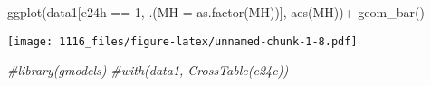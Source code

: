 \documentclass[
]{article}
\newenvironment{Shaded}{\begin{snugshade}}{\end{snugshade}}
\newcommand{\AttributeTok}[1]{\textcolor[rgb]{0.77,0.63,0.00}{#1}}
\newcommand{\CommentTok}[1]{\textcolor[rgb]{0.56,0.35,0.01}{\textit{#1}}}
\newcommand{\DecValTok}[1]{\textcolor[rgb]{0.00,0.00,0.81}{#1}}
\newcommand{\FunctionTok}[1]{\textcolor[rgb]{0.00,0.00,0.00}{#1}}
\newcommand{\NormalTok}[1]{#1}
\newcommand{\SpecialCharTok}[1]{\textcolor[rgb]{0.00,0.00,0.00}{#1}}
\begin{document}
\begin{Shaded}
\begin{Highlighting}[]
\FunctionTok{ggplot}\NormalTok{(data1[e24h }\SpecialCharTok{==} \DecValTok{1}\NormalTok{, .(}\AttributeTok{MH =} \FunctionTok{as.factor}\NormalTok{(MH))], }\FunctionTok{aes}\NormalTok{(MH))}\SpecialCharTok{+}
    \FunctionTok{geom\_bar}\NormalTok{()}
\end{Highlighting}
\end{Shaded}

\texttt{[image: 1116\_files/figure-latex/unnamed-chunk-1-8.pdf]}

\begin{Shaded}
\begin{Highlighting}[]
\CommentTok{\#library(gmodels)}
\CommentTok{\#with(data1, CrossTable(e24c))}
\end{Highlighting}
\end{Shaded}
\end{document}
